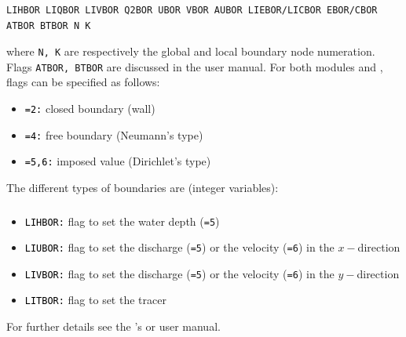 \subsubsection{\gaia{}}
\begin{lstlisting}[frame=trBL]
LIHBOR LIQBOR LIVBOR Q2BOR UBOR VBOR AUBOR LIEBOR/LICBOR EBOR/CBOR ATBOR BTBOR N K
\end{lstlisting}
where \texttt{N, K} are respectively the global and local boundary node numeration. Flags \texttt{ATBOR, BTBOR} are discussed in the  user manual. For both modules  and \gaia{}, flags can be specified as follows:
\begin{itemize}
\item \texttt{\textcolor{black}{=2:}} closed boundary (wall)
\item \texttt{\textcolor{black}{=4:}} free boundary (Neumann's type)
\item \texttt{\textcolor{black}{=5,6:}} imposed value (Dirichlet's type)
\end{itemize}

The different types of boundaries are (integer variables):
\subsubsection{}
\begin{itemize}
\item \texttt{\textcolor{black}{LIHBOR:}} flag to set the water depth (\texttt{=5})
\item \texttt{\textcolor{black}{LIUBOR:}} flag to set the discharge (\texttt{=5}) or the velocity (\texttt{=6}) in the $x-$direction
\item \texttt{\textcolor{black}{LIVBOR:}} flag to set the discharge (\texttt{=5}) or the velocity (\texttt{=6}) in the $y-$direction
\item \texttt{\textcolor{black}{LITBOR:}} flag to set the tracer
\end{itemize}
For further details see the 's or  user manual.
